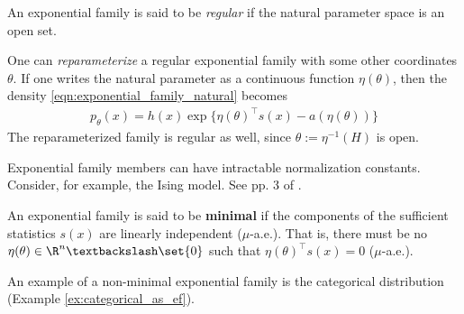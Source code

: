 \documentclass{article} %
\newcommand{\logNormalizerFunction}{a}
\newcommand{\sufficientStatsFunction}{s}
\newcommand{\carrierDensity}{h}
\newcommand{\param}{\theta}
\newcommand{\naturalParam}{\eta}
\newcommand{\naturalParamSpace}{H}
\begin{document}
\begin{definition}
An exponential family is said to be \textit{regular} if the natural parameter space is an open set.
\end{definition}

One can \textit{reparameterize} a regular exponential family with some other coordinates $\param$.  If one writes the natural parameter as a continuous function $\naturalParam(\param)$, then the density \eqref{eqn:exponential_family_natural} becomes
\begin{align}
\label{eqn:exponential_family}
 p_\param(x) = \carrierDensity(x) \exp \{ \naturalParam(\param)^\top \sufficientStatsFunction(x) - \logNormalizerFunction(\naturalParam(\param))\} 
 \end{align}
 The reparameterized family is regular as well, since $\param := \naturalParam^{-1}(\naturalParamSpace)$ is open. 


\begin{remark}
Exponential family members can have intractable normalization constants.  Consider, for example,  the Ising model.  See pp. 3 of \cite{taylor2013multiparameter}.
\end{remark}


\begin{definition}
An exponential family is said to be \textbf{minimal} if the components of the sufficient statistics $\sufficientStatsFunction(x)$ are linearly independent ($\mu$-a.e.).  That is, there must be no $\naturalParam(\param) \in \R^n \textbackslash \set{0}$ such that $\naturalParam(\param)^\top \sufficientStatsFunction(x) = 0$ ($\mu$-a.e.).
\label{def:minimal_exponential_families}
\end{definition}

  An example of a non-minimal exponential family is the categorical distribution (Example \ref{ex:categorical_as_ef}). 

\end{document}
